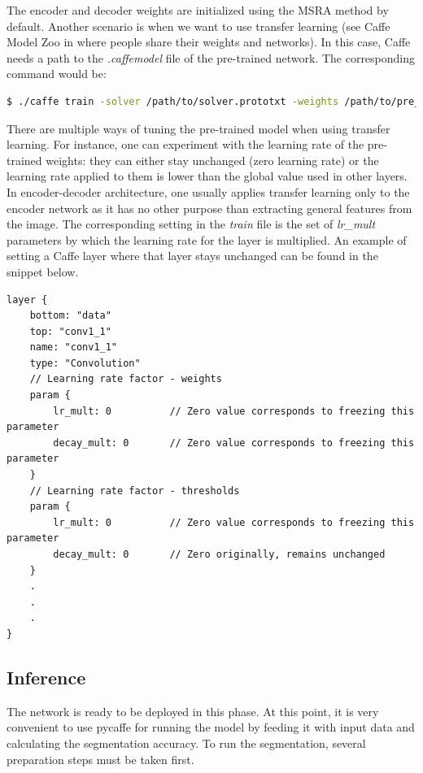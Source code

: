 The encoder and decoder weights are initialized using the MSRA method by default. Another scenario is when we want to use transfer learning (see Caffe Model Zoo in \cite{caffe} where people share their weights and networks). In this case, Caffe needs a path to the \textit{.caffemodel} file of the pre-trained network. The corresponding command would be:

\begin{lstlisting}[language=bash]
$ ./caffe train -solver /path/to/solver.prototxt -weights /path/to/pre_trained_weights.caffemodel
\end{lstlisting}

There are multiple ways of tuning the pre-trained model when using transfer learning. For instance, one can experiment with the learning rate of the pre-trained weights: they can either stay unchanged (zero learning rate) or the learning rate applied to them is lower than the global value used in other layers. \cite{stanford-github} In encoder-decoder architecture, one usually applies transfer learning only to the encoder network as it has no other purpose than extracting general features from the image. The corresponding setting in the \textit{train} file is the set of \textit{lr\_mult} parameters by which the learning rate for the layer is multiplied. An example of setting a Caffe layer where that layer stays unchanged can be found in the snippet below.

\begin{lstlisting}[caption={Setting up \textit{train.prototxt} for transfer learning \cite{filip_github}},captionpos=b]
layer {
	bottom: "data"
	top: "conv1_1"
	name: "conv1_1"
	type: "Convolution"
	// Learning rate factor - weights
	param {
		lr_mult: 0			// Zero value corresponds to freezing this parameter
		decay_mult: 0		// Zero value corresponds to freezing this parameter
	}
	// Learning rate factor - thresholds
	param {
		lr_mult: 0			// Zero value corresponds to freezing this parameter
		decay_mult: 0		// Zero originally, remains unchanged
	}
	.
	.
	.
}
\end{lstlisting}


\newpage
\subsection{Inference}

The network is ready to be deployed in this phase. At this point, it is very convenient to use pycaffe for running the model by feeding it with input data and calculating the segmentation accuracy. To run the segmentation, several preparation steps must be taken first.

